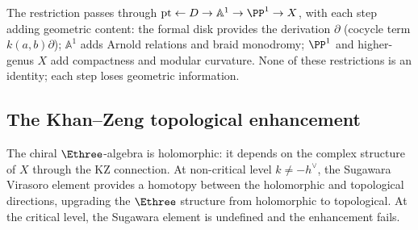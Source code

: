 \begin{remark}
\label{rem:disk-vs-point}
The restriction passes through
$\mathrm{pt} \leftarrow D \to \mathbb{A}^1 \to \PP^1
\to X$, with each step adding geometric content: the formal
disk provides the derivation $\partial$ (cocycle term
$k(a,b)\partial$); $\mathbb{A}^1$ adds Arnold relations
and braid monodromy; $\PP^1$ and higher-genus $X$ add
compactness and modular curvature. None of these
restrictions is an identity; each step loses geometric
information.
\end{remark}


\subsection{The Khan--Zeng topological enhancement}
\label{subsec:khan-zeng-enhancement}

The chiral $\Ethree$-algebra is holomorphic: it depends on the
complex structure of $X$ through the KZ connection. At
non-critical level $k \neq -h^\vee$, the Sugawara Virasoro
element provides a homotopy between the holomorphic and
topological directions, upgrading the $\Ethree$ structure
from holomorphic to topological. At the critical level,
the Sugawara element is undefined and the enhancement fails.

